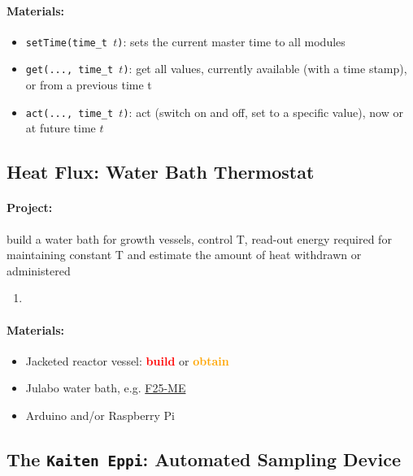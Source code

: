 \documentclass[12pt,a4paper]{scrartcl}
\newcommand{\obtain}[0]{\textcolor{orange}{\textbf{obtain}}}
\newcommand{\build}[0]{\textcolor{red}{\textbf{build}}}
\begin{document}
\paragraph{Materials:}
\begin{itemize}
\item \texttt{setTime(time\_t $t$)}: sets the current master time to
  all modules
\item \texttt{get(..., time\_t $t$)}: get all values, currently
  available (with a time stamp), or from a previous time t
\item \texttt{act(..., time\_t $t$)}: act (switch on and off, set to a
  specific value), now or at future time $t$
\end{itemize}

\newpage
\subsection{Heat Flux: Water Bath Thermostat}
\label{heat}

\paragraph{Project:} build a water bath for growth vessels, control
T, read-out energy required for maintaining constant T and estimate
the amount of heat withdrawn or administered

\begin{enumerate}
\item
\end{enumerate}

\paragraph{Materials:}
\begin{itemize}
\item Jacketed reactor vessel: \build{} or \obtain{}
\item Julabo water bath,
e.g. \href{http://www.laborhandel24.de/9162625-de?utm_source=google_shopping&gclid=Cj0KEQiA496zBRDoi5OY3p2xmaUBEiQArLNnK6uWkryhjvkNdmRLgcg2W_HIO9W1aKaKCO9gmvlkt_MaAmhe8P8HAQ}{F25-ME}
\item Arduino and/or Raspberry Pi
\end{itemize}

\newpage
\subsection{The \texttt{Kaiten Eppi}: Automated Sampling Device} 
\label{sampling}
\end{document}
